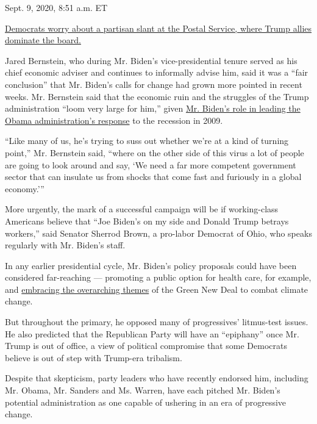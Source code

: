 Sept. 9, 2020, 8:51 a.m. ET

\href{https://www.nytimes3xbfgragh.onion/live/2020/09/09/us/trump-vs-biden\#democrats-worry-about-a-partisan-slant-at-the-postal-service-where-trump-allies-dominate-the-board}{Democrats
worry about a partisan slant at the Postal Service, where Trump allies
dominate the board.}

Jared Bernstein, who during Mr. Biden's vice-presidential tenure served
as his chief economic adviser and continues to informally advise him,
said it was a ``fair conclusion'' that Mr. Biden's calls for change had
grown more pointed in recent weeks. Mr. Bernstein said that the economic
ruin and the struggles of the Trump administration ``loom very large for
him,'' given
\href{https://www.nytimes3xbfgragh.onion/2020/05/04/us/politics/biden-obama-stimulus.html}{Mr.
Biden's role in leading the Obama administration's response} to the
recession in 2009.

``Like many of us, he's trying to suss out whether we're at a kind of
turning point,'' Mr. Bernstein said, ``where on the other side of this
virus a lot of people are going to look around and say, `We need a far
more competent government sector that can insulate us from shocks that
come fast and furiously in a global economy.'''

More urgently, the mark of a successful campaign will be if
working-class Americans believe that ``Joe Biden's on my side and Donald
Trump betrays workers,'' said Senator Sherrod Brown, a pro-labor
Democrat of Ohio, who speaks regularly with Mr. Biden's staff.

In any earlier presidential cycle, Mr. Biden's policy proposals could
have been considered far-reaching --- promoting a public option for
health care, for example, and
\href{https://www.nytimes3xbfgragh.onion/2019/06/04/us/politics/joe-biden-climate-plan.html}{embracing
the overarching themes} of the Green New Deal to combat climate change.

But throughout the primary, he opposed many of progressives' litmus-test
issues. He also predicted that the Republican Party will have an
``epiphany'' once Mr. Trump is out of office, a view of political
compromise that some Democrats believe is out of step with Trump-era
tribalism.

Despite that skepticism, party leaders who have recently endorsed him,
including Mr. Obama, Mr. Sanders and Ms. Warren, have each pitched Mr.
Biden's potential administration as one capable of ushering in an era of
progressive change.

